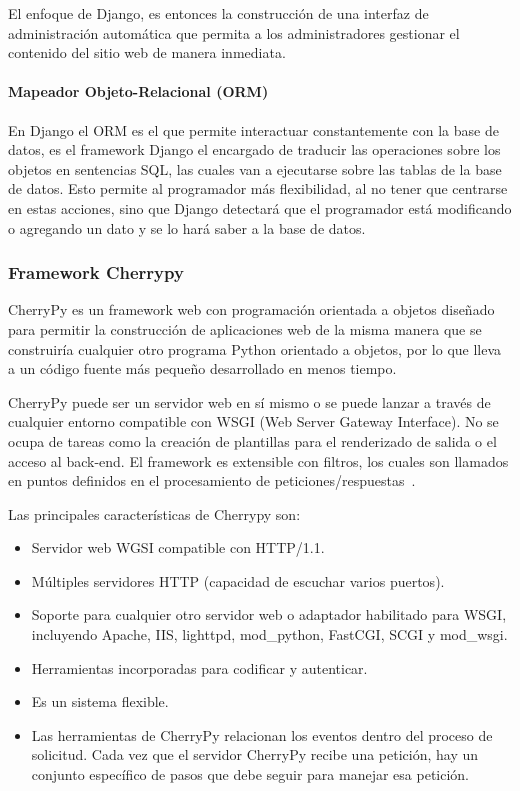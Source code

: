 \documentclass[journal,transmag]{IEEEtran}
\begin{document}
El enfoque de Django, es entonces la construcción de una interfaz de administración automática que permita a los administradores gestionar el contenido del sitio web de manera inmediata.

\paragraph{Mapeador Objeto-Relacional (ORM)} 

En Django el ORM es el que permite interactuar constantemente con la base de datos, es el framework Django el encargado de traducir las operaciones sobre los objetos en sentencias SQL, las cuales van a ejecutarse sobre las tablas de la base de datos. Esto permite al programador más flexibilidad, al no tener que centrarse en estas acciones, sino que Django detectará que el programador está modificando o agregando un dato y se lo hará saber a la base de datos.

\subsubsection{Framework Cherrypy}\label{sub:cherrypy}
CherryPy es un framework web con programación orientada a objetos diseñado para permitir la construcción de aplicaciones web de la misma manera que se construiría cualquier otro programa Python orientado a objetos, por lo que lleva a un código fuente más pequeño desarrollado en menos tiempo.

CherryPy puede ser un servidor web en sí mismo o se puede lanzar a través de cualquier entorno compatible con WSGI (Web Server Gateway Interface). No se ocupa de tareas como la creación de plantillas para el renderizado de salida o el acceso al back-end. El framework es extensible con filtros, los cuales son llamados en puntos definidos en el procesamiento de peticiones/respuestas~\cite{Cherrypy}.

Las principales características de Cherrypy son:

\begin{itemize}
	\item Servidor web WGSI compatible con HTTP/1.1.
	\item Múltiples servidores HTTP (capacidad de escuchar varios puertos).
	\item Soporte para cualquier otro servidor web o adaptador habilitado para WSGI, incluyendo Apache, 	IIS, lighttpd, mod\_python, FastCGI, SCGI y mod\_wsgi.
	\item Herramientas incorporadas para codificar y autenticar.
	\item Es un sistema flexible.
	\item Las herramientas de CherryPy relacionan los eventos dentro del proceso de solicitud. Cada vez que el servidor CherryPy recibe una petición, hay un conjunto específico de pasos que debe seguir para manejar esa petición.
\end{itemize}
\end{document}

